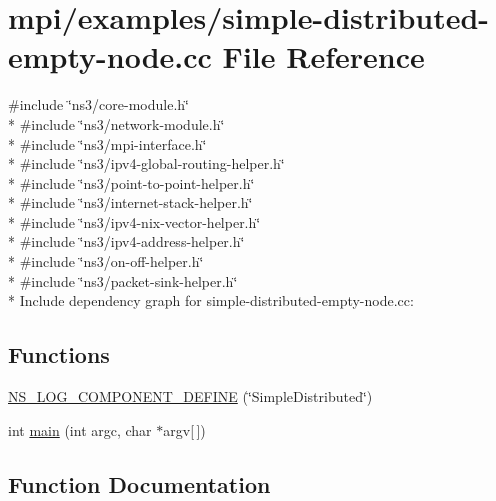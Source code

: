 \hypertarget{simple-distributed-empty-node_8cc}{}\section{mpi/examples/simple-\/distributed-\/empty-\/node.cc File Reference}
\label{simple-distributed-empty-node_8cc}
{\ttfamily \#include \char`\"{}ns3/core-\/module.\+h\char`\"{}}\\*
{\ttfamily \#include \char`\"{}ns3/network-\/module.\+h\char`\"{}}\\*
{\ttfamily \#include \char`\"{}ns3/mpi-\/interface.\+h\char`\"{}}\\*
{\ttfamily \#include \char`\"{}ns3/ipv4-\/global-\/routing-\/helper.\+h\char`\"{}}\\*
{\ttfamily \#include \char`\"{}ns3/point-\/to-\/point-\/helper.\+h\char`\"{}}\\*
{\ttfamily \#include \char`\"{}ns3/internet-\/stack-\/helper.\+h\char`\"{}}\\*
{\ttfamily \#include \char`\"{}ns3/ipv4-\/nix-\/vector-\/helper.\+h\char`\"{}}\\*
{\ttfamily \#include \char`\"{}ns3/ipv4-\/address-\/helper.\+h\char`\"{}}\\*
{\ttfamily \#include \char`\"{}ns3/on-\/off-\/helper.\+h\char`\"{}}\\*
{\ttfamily \#include \char`\"{}ns3/packet-\/sink-\/helper.\+h\char`\"{}}\\*
Include dependency graph for simple-\/distributed-\/empty-\/node.cc\+:
\subsection*{Functions}
\begin{DoxyCompactItemize}
\item 
\hyperlink{simple-distributed-empty-node_8cc_a1b2a18e518450712e15682beb2ad64fa}{N\+S\+\_\+\+L\+O\+G\+\_\+\+C\+O\+M\+P\+O\+N\+E\+N\+T\+\_\+\+D\+E\+F\+I\+NE} (\char`\"{}Simple\+Distributed\char`\"{})
\item 
int \hyperlink{simple-distributed-empty-node_8cc_a0ddf1224851353fc92bfbff6f499fa97}{main} (int argc, char $\ast$argv\mbox{[}$\,$\mbox{]})
\end{DoxyCompactItemize}


\subsection{Function Documentation}
